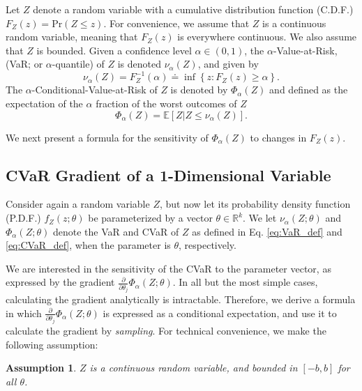 \documentclass[letterpaper]{article}
\newcommand{\prob}{\mathrm{Pr}}
\newcommand{\E}{\mathbb{E}}
\newcommand{\R}{\mathbb{R}}
\newcommand{\cvar}{\Phi_\alpha}
\newcommand{\var}{\nu_\alpha}
\newcommand{\Dth}{\frac{\partial}{\partial \theta_j}}
\newtheorem{assumption}{Assumption}
\begin{document}
Let $Z$ denote a random variable with a cumulative distribution function (C.D.F.) $F_Z(z) = \prob(Z \leq z)$. For convenience, we assume that $Z$ is a continuous random variable, meaning that $F_Z(z)$ is everywhere continuous. We also assume that $Z$ is bounded.
Given a confidence level $\alpha\in (0,1)$, the $\alpha$-Value-at-Risk, (VaR; or $\alpha$-quantile) of $Z$ is denoted $\var(Z)$, and given by
\begin{equation}\label{eq:VaR_def}
\var (Z) = F_Z^{-1}(\alpha) \doteq \inf\left\{z:F_Z(z) \geq \alpha \right\}.
\end{equation}
The $\alpha$-Conditional-Value-at-Risk of $Z$ is denoted by $\cvar(Z)$ and defined as the expectation of the $\alpha$ fraction of the worst outcomes of $Z$
\begin{equation}\label{eq:CVaR_def}
\cvar (Z) = \E \left[ \left. Z \right| Z \leq \var (Z)\right].
\end{equation}

We next present a formula for the sensitivity of $\cvar(Z)$ to changes in $F_Z(z)$.
\subsection{CVaR Gradient of a 1-Dimensional Variable}\label{ssec:1D_formula}

Consider again a random variable $Z$, but now let its probability density function (P.D.F.) $f_Z(z;\theta)$ be parameterized by a vector $\theta \in \R^k$. We let $\var (Z;\theta)$ and $\cvar (Z;\theta)$ denote the VaR and CVaR of $Z$ as defined in Eq. \eqref{eq:VaR_def} and \eqref{eq:CVaR_def}, when the parameter is $\theta$, respectively.

We are interested in the sensitivity of the CVaR to the parameter vector, as expressed by the gradient $\Dth \cvar (Z;\theta)$. In all but the most simple cases, calculating the gradient analytically is intractable. Therefore, we derive a formula in which $\Dth \cvar (Z;\theta)$ is expressed as a conditional expectation, and use it to calculate the gradient by \emph{sampling}.
For technical convenience, we make the following assumption:
\begin{assumption}\label{assumption:bounded_cont_Z}
$Z$ is a continuous random variable, and bounded in $[-b,b]$ for all $\theta$.
\end{assumption}
\end{document}
